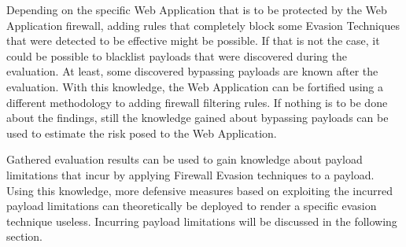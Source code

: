 Depending on the specific Web Application that is to be protected by the Web Application firewall, adding rules that completely block some Evasion Techniques that were detected to be effective might be possible. If that is not the case, it could be possible to blacklist payloads that were discovered during the evaluation. At least, some discovered bypassing payloads are known after the evaluation. With this knowledge, the Web Application can be fortified using a different methodology to adding firewall filtering rules. If nothing is to be done about the findings, still the knowledge gained about bypassing payloads can be used to estimate the risk posed to the Web Application. 

Gathered evaluation results can be used to gain knowledge about payload limitations that incur by applying Firewall Evasion techniques to a payload. Using this knowledge, more defensive measures based on exploiting the incurred payload limitations can theoretically be deployed to render a specific evasion technique useless. Incurring payload limitations will be discussed in the following section.
